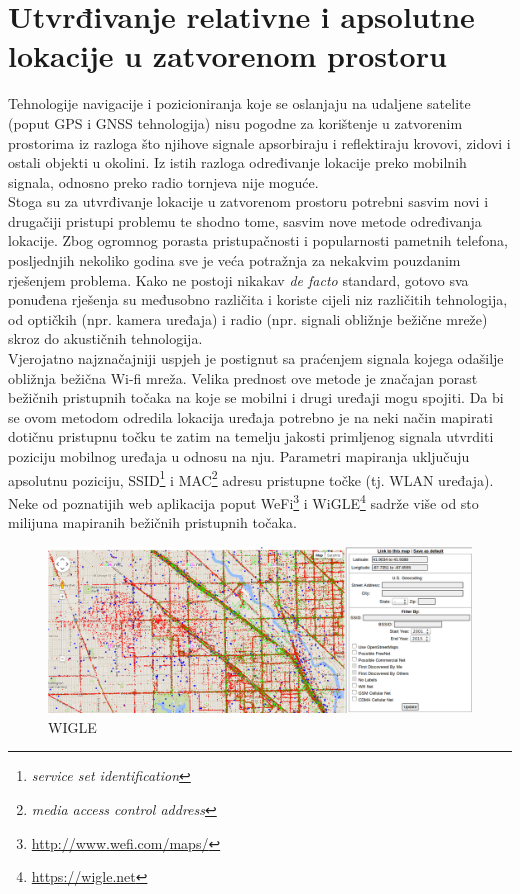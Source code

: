 \chapter{Utvrđivanje relativne i apsolutne lokacije u zatvorenom prostoru}

Tehnologije navigacije i pozicioniranja koje se oslanjaju na udaljene satelite (poput GPS i GNSS tehnologija) nisu pogodne za korištenje u zatvorenim prostorima iz razloga što njihove signale apsorbiraju i reflektiraju krovovi, zidovi i ostali objekti u okolini. 
Iz istih razloga određivanje lokacije preko mobilnih signala, odnosno preko radio tornjeva nije moguće. 
\\
Stoga su za utvrđivanje lokacije u zatvorenom prostoru potrebni sasvim novi i drugačiji pristupi problemu te shodno tome, sasvim nove metode određivanja lokacije. 
Zbog ogromnog porasta pristupačnosti i popularnosti pametnih telefona, posljednjih nekoliko godina sve je veća potražnja za nekakvim pouzdanim rješenjem problema. 
Kako ne postoji nikakav \textit{de facto} standard, gotovo sva ponuđena rješenja su međusobno različita i koriste cijeli niz različitih tehnologija, od optičkih (npr. kamera uređaja) i radio (npr. signali obližnje bežične mreže) skroz do akustičnih tehnologija.
\\

Vjerojatno najznačajniji uspjeh je postignut sa praćenjem signala kojega odašilje obližnja bežična Wi-fi mreža. 
Velika prednost ove metode je značajan porast bežičnih pristupnih točaka na koje se mobilni i drugi uređaji mogu spojiti. 
Da bi se ovom metodom odredila lokacija uređaja potrebno je na neki način mapirati dotičnu pristupnu točku te zatim na temelju jakosti primljenog signala utvrditi poziciju mobilnog uređaja u odnosu na nju. 
Parametri mapiranja uključuju apsolutnu poziciju, SSID\footnote{\textit{service set identification}} i MAC\footnote{\textit{media access control address}} adresu pristupne točke (tj. WLAN uređaja). 
Neke od poznatijih web aplikacija poput WeFi\footnote{\url{http://www.wefi.com/maps/}} i WiGLE\footnote{\url{https://wigle.net}} sadrže više od sto milijuna mapiranih bežičnih pristupnih točaka. 
\\

\begin{figure}
    \centering
    \includegraphics[scale=0.3]{pictures/WiGLE}
    \caption{WIGLE} %
\end{figure}

